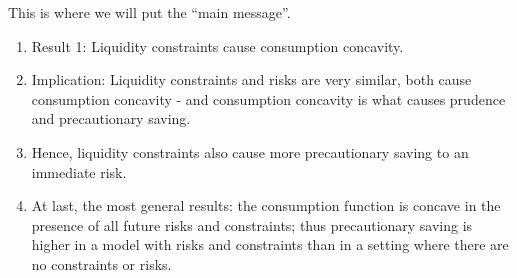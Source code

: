     This is where we will put the ``main message''.

    \begin{enumerate}
    \item Result 1: Liquidity constraints cause consumption concavity.
    \item Implication: Liquidity constraints and risks are very similar, both cause consumption concavity - and consumption concavity is what causes prudence and precautionary saving.
    \item Hence, liquidity constraints also cause more precautionary saving to an immediate risk.
    \item At last, the most general results: the consumption function is concave in the presence of all future risks and constraints; thus precautionary saving is higher in a model with risks and constraints than in a setting where there are no constraints or risks.
    \end{enumerate}
  
